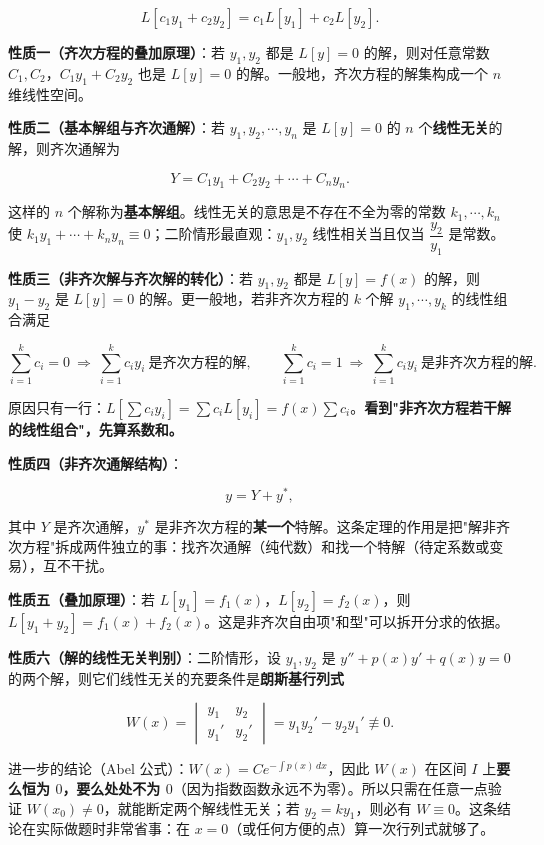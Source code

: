 \documentclass[11pt,openany,UTF8]{ctexbook}
\begin{document}
\[L\left[c_1y_1+c_2y_2\right]=c_1L[y_1]+c_2L[y_2].\]

\textbf{性质一（齐次方程的叠加原理）}：若 $y_1,y_2$ 都是 $L[y]=0$ 的解，则对任意常数 $C_1,C_2$，$C_1y_1+C_2y_2$ 也是 $L[y]=0$ 的解。一般地，齐次方程的解集构成一个 $n$ 维线性空间。

\textbf{性质二（基本解组与齐次通解）}：若 $y_1,y_2,\cdots,y_n$ 是 $L[y]=0$ 的 $n$ 个\textbf{线性无关}的解，则齐次通解为

\[Y=C_1y_1+C_2y_2+\cdots+C_ny_n .\]

这样的 $n$ 个解称为\textbf{基本解组}。线性无关的意思是不存在不全为零的常数 $k_1,\cdots,k_n$ 使 $k_1y_1+\cdots+k_ny_n\equiv 0$；二阶情形最直观：$y_1,y_2$ 线性相关当且仅当 $\dfrac{y_2}{y_1}$ 是常数。

\textbf{性质三（非齐次解与齐次解的转化）}：若 $y_1,y_2$ 都是 $L[y]=f(x)$ 的解，则 $y_1-y_2$ 是 $L[y]=0$ 的解。更一般地，若非齐次方程的 $k$ 个解 $y_1,\cdots,y_k$ 的线性组合满足

\[\sum_{i=1}^{k}c_i=0 \ \Longrightarrow\ \sum_{i=1}^{k}c_iy_i \ \text{是齐次方程的解},\qquad
\sum_{i=1}^{k}c_i=1 \ \Longrightarrow\ \sum_{i=1}^{k}c_iy_i \ \text{是非齐次方程的解}.\]

原因只有一行：$L\!\left[\sum c_iy_i\right]=\sum c_iL[y_i]=f(x)\sum c_i$。\textbf{看到"非齐次方程若干解的线性组合"，先算系数和。}

\textbf{性质四（非齐次通解结构）}：

\[y=Y+y^{*},\]

其中 $Y$ 是齐次通解，$y^{*}$ 是非齐次方程的\textbf{某一个}特解。这条定理的作用是把"解非齐次方程"拆成两件独立的事：找齐次通解（纯代数）和找一个特解（待定系数或变易），互不干扰。

\textbf{性质五（叠加原理）}：若 $L[y_1]=f_1(x)$，$L[y_2]=f_2(x)$，则 $L[y_1+y_2]=f_1(x)+f_2(x)$。这是非齐次自由项"和型"可以拆开分求的依据。

\textbf{性质六（解的线性无关判别）}：二阶情形，设 $y_1,y_2$ 是 $y''+p(x)y'+q(x)y=0$ 的两个解，则它们线性无关的充要条件是\textbf{朗斯基行列式}

\[W(x)=\begin{vmatrix} y_1 & y_2\\ y_1' & y_2' \end{vmatrix}=y_1y_2'-y_2y_1'\not\equiv 0 .\]

进一步的结论（Abel 公式）：$W(x)=Ce^{-\int p(x)\,dx}$，因此 $W(x)$ 在区间 $I$ 上\textbf{要么恒为 $0$，要么处处不为 $0$}（因为指数函数永远不为零）。所以只需在任意一点验证 $W(x_0)\ne 0$，就能断定两个解线性无关；若 $y_2=ky_1$，则必有 $W\equiv 0$。这条结论在实际做题时非常省事：在 $x=0$（或任何方便的点）算一次行列式就够了。
\end{document}
